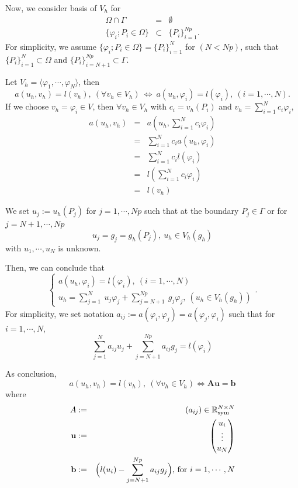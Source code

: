 \documentclass[a4paper,10pt]{article}
\begin{document}
Now, we consider basis of $ V_h $ for
\begin{eqnarray} \nonumber
\Omega \cap \Gamma &=& \emptyset \\ \nonumber
\{\varphi_i ; P_i \in \Omega \} &\subset& \{P_i \}_{i=1}^{Np}.
\end{eqnarray}
For simplicity, we assume $ \{\varphi_i ; P_i \in \Omega \} = \{P_i\}_{i=1}^N $ for $(N < Np) $, such that $ \{P_i\}_{i=1}^N \subset \Omega $ and $ \{P_i\}_{i=N+1}^{Np} \subset \Gamma $. 

Let $ V_h = \langle \varphi_1, \cdots , \varphi_N \rangle $, then 
\begin{equation*}
a(u_h , v_h)=l(v_h), \ (\forall v_h \in V_h) \ \Leftrightarrow \ a(u_h , \varphi_i) = l(\varphi_i), \ (i=1, \cdots , N).
\end{equation*}
If we choose $ v_h = \varphi_i \in V $, then $ \forall v_h \in V_h $ with $ c_i = v_h (P_i) $ and $ v_h = \sum_{i=1}^{N} c_i \varphi_i $,
\begin{eqnarray}\nonumber
a(u_h,v_h) &=& a(u_h,\sum_{i=1}^{N} c_i \varphi_i)\\ \nonumber
&=&\sum_{i=1}^{N} c_i a (u_h, \varphi_i) \\ \nonumber
&=& \sum_{i=1}^{N} c_i l(\varphi_i)\\ \nonumber
&=& l(\sum_{i=1}^{N} c_i \varphi_i) \\ \nonumber
&=& l(v_h)
\end{eqnarray}

We set $ u_j := u_h(P_j)$ for $ j=1, \cdots , Np $ such that at the boundary $ P_j \in \Gamma $ or for $ j=N+1, \cdots, Np $
\begin{equation*}
u_j = g_j = g_h(P_j), \ u_h \in V_h(g_h)
\end{equation*}
with $ u_{1}, \cdots, u_{N} $ is unknown.

Then, we can conclude that
\begin{equation*} 
\begin{cases}
a(u_h, \varphi_i) = l(\varphi_i), \ (i=1, \cdots , N)\\
u_h = \sum_{j=1}^{N} \ u_j \varphi_j + \sum_{j=N+1}^{Np} \ g_j \varphi_j, \ (u_h \in V_h (g_h))
\end{cases}.
\end{equation*}
For simplicity, we set notation $ a_{ij} := a(\varphi_i, \varphi_j) = a(\varphi_j, \varphi_i)$ such that for $  i=1, \cdots , N $,
\[\sum_{j=1}^{N} a_{ij} u_{j} + \sum_{j=N+1}^{Np} a_{ij} g_j = l(\varphi_i)\]

As conclusion, 
\[ a(u_h , v_h)=l(v_h), \ (\forall v_h \in V_h) \Leftrightarrow \mathbf{A} \mathbf{u} = \mathbf{b} \]
where
\begin{eqnarray}\nonumber
A &:=& (a_{ij}) \in \mathbb{R}_{\text{sym}}^{N \times N}\\ \nonumber
\text{\textbf{u}} &:=& \begin{pmatrix}
u_i \\ \vdots \\ u_{N}
\end{pmatrix}\\ \nonumber
\text{\textbf{b}} &:=& \Big(l(u_i) - \sum_{j=N+1}^{Np} a_{ij} g_j\Big) \text{, for }{i=1, \cdots , N}
\end{eqnarray}
\end{document}
